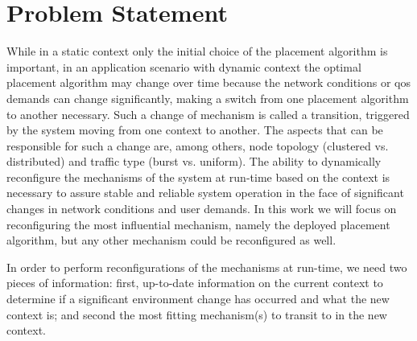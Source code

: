 \section{Problem Statement}
While in a static context only the initial choice of the placement algorithm is important, in an application scenario with dynamic context the optimal placement algorithm may change over time because the network conditions or \gls{qos} demands can change significantly, making a switch from one placement algorithm to another necessary. Such a change of mechanism is called a transition, triggered by the system moving from one context to another. The aspects that can be responsible for such a change are, among others, node topology (clustered vs. distributed) and traffic type (burst vs. uniform). 
The ability to dynamically reconfigure the mechanisms of the system at run-time based on the context is necessary to assure stable and reliable system operation in the face of significant changes in network conditions and user demands. 
In this work we will focus on reconfiguring the most influential mechanism, namely the deployed placement algorithm, but any other mechanism could be reconfigured as well. 

In order to perform reconfigurations of the mechanisms at run-time, we need two pieces of information: first, up-to-date information on the current context to determine if a significant environment change has occurred and what the new context is; and second the most fitting mechanism(s) to transit to in the new context.
 

